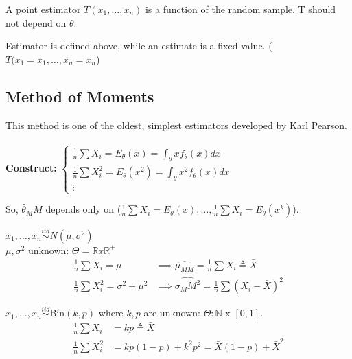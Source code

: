 \documentclass[11pt,fleqn]{book} %
\begin{document}
 \begin{definition}
 	A point estimator $T(x_1, \dots, x_n)$ is a function of the random sample. T should not depend on $\theta$. 
 \end{definition}

 \begin{remark}
 	Estimator is defined above, while an estimate is a fixed value. ($T(x_1 = x_1, \dots, x_n = x_n$)
 \end{remark}

 \subsection{Method of Moments}

	This method is one of the oldest, simplest estimators developed by Karl Pearson.\\ 
	\\
	\textbf{Construct:} $\begin{cases}
	               \frac{1}{n} \sum X_i = E_\theta(x) = \int_\theta x f_\theta(x) dx\\
	               \frac{1}{n} \sum X_i^2 = E_\theta(x^2) = \int_\theta x^2 f_\theta(x) dx\\
	               \vdots
	            \end{cases}$

	So, $\hat{\theta}_MM$ depends only on ($\frac{1}{n} \sum X_i = E_\theta(x), \dots, \frac{1}{n} \sum X_i = E_\theta(x^k)$).

	\begin{example}
		$x_1, \dots, x_n \overset{iid}{\sim} N(\mu, \sigma^2)$\\
		$\mu, \sigma^2$ unknown: $\Theta = \mathbb{R} x \mathbb{R}^+$\\
		\begin{align*}
		\frac{1}{n} \sum X_i = \mu &\implies \hat{\mu_{MM}} = \frac{1}{n} \sum X_i \triangleq \bar{X}\\
		\frac{1}{n} \sum X_i^2 = \sigma^2 + \mu^2 &\implies \hat{\sigma_MM^2} = \frac{1}{n} \sum (X_i - \bar{X})^2
		\end{align*}
	\end{example}

	\begin{example}
		$x_1, \dots, x_n \overset{iid}{\sim} \text{Bin}(k,p)$ where $k, p$ are unknown: $\Theta: \mathbb{N} \text{ x } [0,1]$.\\

		\begin{align*}
		\frac{1}{n} \sum X_i &= kp \triangleq \bar{X}\\
		\frac{1}{n} \sum X_i^2 &= kp(1-p) + k^2p^2 = \bar{X}(1-p) + \bar{X}^2
		\end{align*}
	\end{example}
\end{document}
